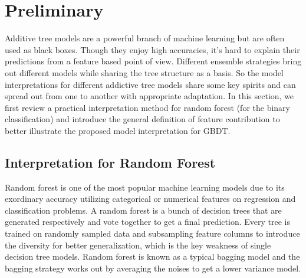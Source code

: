 \section{Preliminary}\label{secpre}

Additive tree models are a powerful branch of machine learning 
but are often used as black boxes. Though they enjoy high accuracies, 
it's hard to explain  their predictions from a feature based point of view. 
Different ensemble strategies 
bring out different models while sharing the tree structure as a basis. So the model interpretations for different addictive 
tree models share some key spirits and can spread out from one to another with appropriate adaptation. In this section, 
we first review a practical interpretation method for random forest (for the binary classification) and introduce the general definition of feature
contribution to better illustrate the proposed model interpretation for GBDT. 

\subsection{Interpretation for Random Forest}\label{secrf}
Random forest is one of the most popular machine learning models due to its exordinary
accuracy utilizing categorical or numerical features on regression 
and classification problems. A random forest is a bunch of  
decision trees that are generated respectively and vote together to get a final prediction. Every tree is trained on randomly sampled
data and subsampling feature columns to introduce the diversity for better generalization, which is the key weakness of single
decision tree models. Random forest is known as a typical bagging model and the bagging strategy works out by averaging the noises to get a lower variance model. 


